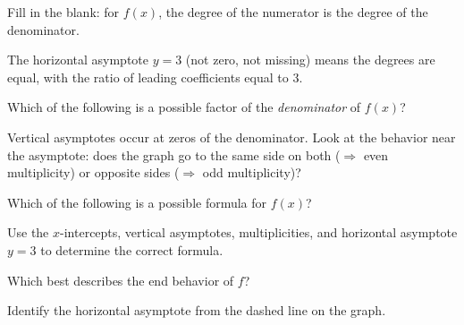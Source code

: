 \documentclass{ximera}
\begin{document}
\begin{problem}
Fill in the blank: for $f(x)$, the degree of the numerator is \underline{\hspace{0.75in}} the degree of the denominator.
\begin{hint}
The horizontal asymptote $y=3$ (not zero, not missing) means the degrees are equal, with the ratio of leading coefficients equal to 3.
\end{hint}
\begin{multipleChoice}
\end{multipleChoice}
\end{problem}

\begin{problem}
Which of the following is a possible factor of the \emph{denominator} of $f(x)$?
\begin{hint}
Vertical asymptotes occur at zeros of the denominator. Look at the behavior near the asymptote: does the graph go to the same side on both ($\Rightarrow$ even multiplicity) or opposite sides ($\Rightarrow$ odd multiplicity)?
\end{hint}
\begin{multipleChoice}
\end{multipleChoice}
\end{problem}

\begin{problem}
Which of the following is a possible formula for $f(x)$?
\begin{hint}
Use the $x$-intercepts, vertical asymptotes, multiplicities, and horizontal asymptote $y=3$ to determine the correct formula.
\end{hint}
\begin{multipleChoice}
\end{multipleChoice}
\end{problem}

\begin{problem}
Which best describes the end behavior of $f$?
\begin{hint}
Identify the horizontal asymptote from the dashed line on the graph.
\end{hint}
\begin{multipleChoice}
\end{multipleChoice}
\end{problem}
\end{document}
